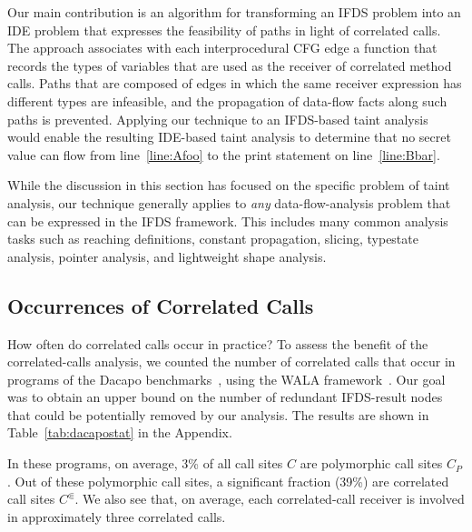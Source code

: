 Our main contribution is an algorithm for transforming an IFDS problem 
into an IDE problem that expresses the feasibility of paths
in light of correlated calls.
The approach associates with each interprocedural CFG edge 
a function that records the types of 
variables that are used as the receiver of correlated method calls. Paths that 
are composed of edges in which the same receiver expression has different types
are infeasible, and the propagation of data-flow facts along such paths is
prevented. Applying our technique to an IFDS-based taint analysis would enable
the resulting IDE-based taint analysis to determine that no secret value can flow from
line~\ref{line:Afoo} to the print statement on line~\ref{line:Bbar}. 

While the discussion in this section has focused on the specific problem of taint analysis,
our technique generally applies to \textit{any}
data-flow-analysis problem that can be expressed in the IFDS framework. This includes
many common analysis tasks such as reaching definitions, constant propagation, slicing,
typestate analysis, pointer analysis, and lightweight
shape analysis.

\subsection{Occurrences of Correlated Calls}\label{sec:occur}\vspace{-.5mm}
How often do correlated calls occur in practice? To assess the benefit of the correlated-calls analysis, we counted the number of correlated calls that occur in programs of the Dacapo benchmarks~\cite{blackburn2006dacapo}, using the WALA framework~\cite{fink2012wala}.
Our goal was to obtain an upper bound on the number of redundant IFDS-result nodes that could be potentially removed by our analysis. The results are shown in Table~\ref{tab:dacapostat} in the Appendix.

In these programs, on average, 3\% of all call sites $C$ are polymorphic call sites $C_P$.
Out of these polymorphic call sites, a significant fraction (39\%) are correlated 
call sites $C^\Subset$. We also see that, on average,  each correlated-call receiver is involved in approximately
three correlated calls. 

